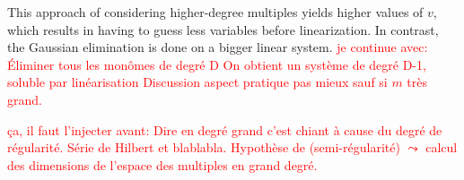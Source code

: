 \documentclass[a4paper,UKenglish,cleveref, autoref]{lipics-v2019}
\begin{document}
This approach of considering higher-degree multiples yields higher values of $v$, which results in having to guess less variables before linearization. In contrast, the Gaussian elimination is done on a bigger linear system. 
\textcolor{red}{je continue avec:
	Éliminer tous les monômes de degré D
	On obtient un système de degré D-1, soluble par linéarisation
	Discussion aspect pratique pas mieux sauf si $m$ très grand.
}

\textcolor{red}{ça, il faut l'injecter avant:
	Dire en degré grand c'est chiant à cause du degré de régularité. Série de Hilbert et blablabla. Hypothèse de (semi-régularité) $\leadsto$ calcul des dimensions de l'espace des multiples en grand degré.}





\end{document}
